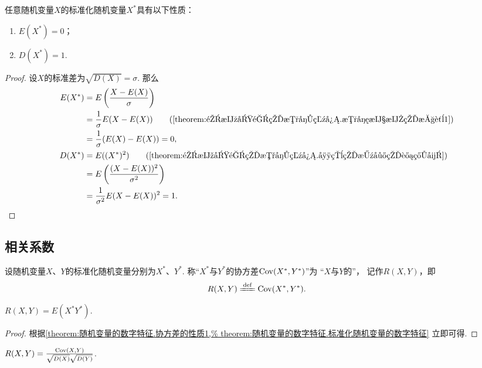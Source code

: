 \begin{property}\label{theorem:随机变量的数字特征.标准化随机变量的数字特征}
任意随机变量\(X\)的标准化随机变量\(X^*\)具有以下性质：
\begin{enumerate}
    \item \(E(X^*)=0\)；
    \item \(D(X^*)=1\).
\end{enumerate}
\begin{proof}
设\(X\)的标准差为\(\sqrt{D(X)}=\sigma\).
那么\begin{align*}
    E(X^*)
	&= E\left(\frac{X-E(X)}{\sigma}\right) \\
	&= \frac1\sigma E(X-E(X))
		\tag{\cref{theorem:随机变量的数字特征.数学期望的性质1}} \\
	&= \frac1\sigma (E(X) - E(X))
	= 0, \\
    D(X^*)
	&= E((X^*)^2)
		\tag{\cref{theorem:随机变量的数字特征.常用的方差的计算式}} \\
	&= E\left(\frac{(X-E(X))^2}{\sigma^2}\right) \\
	&= \frac{1}{\sigma^2} E(X-E(X))^2
	= 1.
    \qedhere
\end{align*}
\end{proof}
\end{property}

\subsection{相关系数}
\begin{definition}\label{definition:随机变量的数字特征.相关系数}
设随机变量\(X\)、\(Y\)的标准化随机变量分别为\(X^*\)、\(Y^*\).
称“\(X^*\)与\(Y^*\)的协方差\(\operatorname{Cov}(X^*,Y^*)\)”为%
“\(X\)与\(Y\)的”，
记作\(R(X,Y)\)，即\[
    R(X,Y) \defeq \Cov(X^*,Y^*).
\]
\end{definition}

\begin{theorem}\label{theorem:随机变量的数字特征.相关系数的性质1}
\(R(X,Y) = E(X^* Y^*)\).
\begin{proof}
根据\cref{theorem:随机变量的数字特征.协方差的性质1,%
theorem:随机变量的数字特征.标准化随机变量的数字特征} 立即可得.
\end{proof}
\end{theorem}

\begin{theorem}\label{theorem:随机变量的数字特征.相关系数的性质2}
\(R(X,Y) = \frac{\operatorname{Cov}(X,Y)}{\sqrt{D(X)} \sqrt{D(Y)}}\).
\end{theorem}

